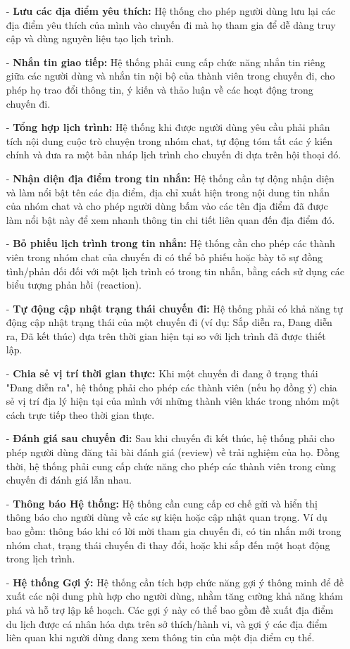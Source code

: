 \begin{itemize}
    \item[-] \textbf{Lưu các địa điểm yêu thích:} Hệ thống cho phép người dùng lưu lại các địa điểm yêu thích của mình vào chuyến đi mà họ tham gia để dễ dàng truy cập và dùng nguyên liệu tạo lịch trình.
    \item[-] \textbf{Nhắn tin giao tiếp:} Hệ thống phải cung cấp chức năng nhắn tin riêng giữa các người dùng và nhắn tin nội bộ của thành viên trong chuyến đi, cho phép họ trao đổi thông tin, ý kiến và thảo luận về các hoạt động trong chuyến đi.
    \item[-] \textbf{Tổng hợp lịch trình:} Hệ thống khi được người dùng yêu cầu phải phân tích nội dung cuộc trò chuyện trong nhóm chat, tự động tóm tắt các ý kiến chính và đưa ra một bản nháp lịch trình cho chuyến đi dựa trên hội thoại đó.
    \item[-] \textbf{Nhận diện địa điểm trong tin nhắn:} Hệ thống cần tự động nhận diện và làm nổi bật tên các địa điểm, địa chỉ xuất hiện trong nội dung tin nhắn của nhóm chat và cho phép người dùng bấm vào các tên địa điểm đã được làm nổi bật này để xem nhanh thông tin chi tiết liên quan đến địa điểm đó.
    \item[-] \textbf{Bỏ phiếu lịch trình trong tin nhắn:} Hệ thống cần cho phép các thành viên trong nhóm chat của chuyến đi có thể bỏ phiếu hoặc bày tỏ sự đồng tình/phản đối đối với một lịch trình có trong tin nhắn, bằng cách sử dụng các biểu tượng phản hồi (reaction).
    \item[-] \textbf{Tự động cập nhật trạng thái chuyến đi:} Hệ thống phải có khả năng tự động cập nhật trạng thái của một chuyến đi (ví dụ: Sắp diễn ra, Đang diễn ra, Đã kết thúc) dựa trên thời gian hiện tại so với lịch trình đã được thiết lập.
    \item[-] \textbf{Chia sẻ vị trí thời gian thực:} Khi một chuyến đi đang ở trạng thái "Đang diễn ra", hệ thống phải cho phép các thành viên (nếu họ đồng ý) chia sẻ vị trí địa lý hiện tại của mình với những thành viên khác trong nhóm một cách trực tiếp theo thời gian thực.
    \item[-] \textbf{Đánh giá sau chuyến đi:} Sau khi chuyến đi kết thúc, hệ thống phải cho phép người dùng đăng tải bài đánh giá (review) về trải nghiệm của họ. Đồng thời, hệ thống phải cung cấp chức năng cho phép các thành viên trong cùng chuyến đi đánh giá lẫn nhau.
    \item[-] \textbf{Thông báo Hệ thống:} Hệ thống cần cung cấp cơ chế gửi và hiển thị thông báo cho người dùng về các sự kiện hoặc cập nhật quan trọng. Ví dụ bao gồm: thông báo khi có lời mời tham gia chuyến đi, có tin nhắn mới trong nhóm chat, trạng thái chuyến đi thay đổi, hoặc khi sắp đến một hoạt động trong lịch trình.
    \item[-] \textbf{Hệ thống Gợi ý:} Hệ thống cần tích hợp chức năng gợi ý thông minh để đề xuất các nội dung phù hợp cho người dùng, nhằm tăng cường khả năng khám phá và hỗ trợ lập kế hoạch. Các gợi ý này có thể bao gồm đề xuất địa điểm du lịch được cá nhân hóa dựa trên sở thích/hành vi, và gợi ý các địa điểm liên quan khi người dùng đang xem thông tin của một địa điểm cụ thể.
\end{itemize}

